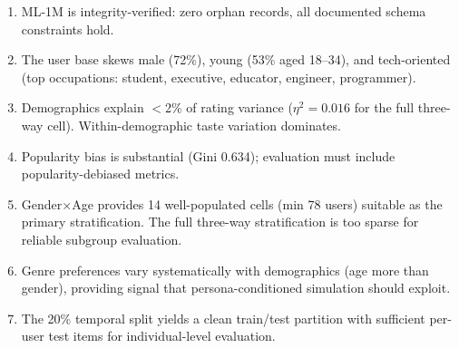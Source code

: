 \begin{enumerate}
    \item ML-1M is integrity-verified: zero orphan records, all documented schema constraints hold.
    \item The user base skews male (72\%), young (53\% aged 18--34), and tech-oriented (top occupations: student, executive, educator, engineer, programmer).
    \item Demographics explain $<$2\% of rating variance ($\eta^2 = 0.016$ for the full three-way cell). Within-demographic taste variation dominates.
    \item Popularity bias is substantial (Gini 0.634); evaluation must include popularity-debiased metrics.
    \item Gender$\times$Age provides 14 well-populated cells (min 78 users) suitable as the primary stratification. The full three-way stratification is too sparse for reliable subgroup evaluation.
    \item Genre preferences vary systematically with demographics (age more than gender), providing signal that persona-conditioned simulation should exploit.
    \item The 20\% temporal split yields a clean train/test partition with sufficient per-user test items for individual-level evaluation.
\end{enumerate}
